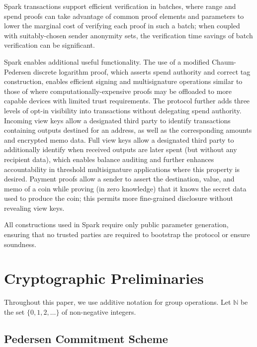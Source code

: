 \documentclass{llncs}
\begin{document}
Spark transactions support efficient verification in batches, where range and spend proofs can take advantage of common proof elements and parameters to lower the marginal cost of verifying each proof in such a batch; when coupled with suitably-chosen sender anonymity sets, the verification time savings of batch verification can be significant.

Spark enables additional useful functionality.
The use of a modified Chaum-Pedersen discrete logarithm proof, which asserts spend authority and correct tag construction, enables efficient signing and multisignature operations similar to those of \cite{musig,frost,schnorrwithschnorr} where computationally-expensive proofs may be offloaded to more capable devices with limited trust requirements.
The protocol further adds three levels of opt-in visibility into transactions without delegating spend authority.
Incoming view keys allow a designated third party to identify transactions containing outputs destined for an address, as well as the corresponding amounts and encrypted memo data.
Full view keys allow a designated third party to additionally identify when received outputs are later spent (but without any recipient data), which enables balance auditing and further enhances accountability in threshold multisignature applications where this property is desired.
Payment proofs allow a sender to assert the destination, value, and memo of a coin while proving (in zero knowledge) that it knows the secret data used to produce the coin; this permits more fine-grained disclosure without revealing view keys.

All constructions used in Spark require only public parameter generation, ensuring that no trusted parties are required to bootstrap the protocol or ensure soundness.


\section{Cryptographic Preliminaries}

Throughout this paper, we use additive notation for group operations.
Let $\mathbb{N}$ be the set $\{0,1,2,\ldots\}$ of non-negative integers.


\subsection{Pedersen Commitment Scheme}
\end{document}
